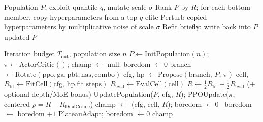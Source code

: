 \begin{algorithm}[t]
\caption{PBT exploit--mutate}
\label{alg:pbt}
\begin{algorithmic}[1]
\Require Population $P$, exploit quantile $q$, mutate scale $\sigma$
\State Rank $P$ by $R$; for each bottom member, copy hyperparameters from a top-$q$ elite
\State Perturb copied hyperparameters by multiplicative noise of scale $\sigma$
\State Refit briefly; write back into $P$
\State \Return updated $P$
\end{algorithmic}
\end{algorithm}

\begin{algorithm}[t]
\caption{HybridMetaSearch}
\label{alg:hybrid}
\begin{algorithmic}[1]
\Require Iteration budget $T_{\mathrm{out}}$, population size $n$
\State $P \gets \mathrm{InitPopulation}(n)$; $\pi \gets \mathrm{ActorCritic}()$; champ $\gets$ null; boredom $\gets 0$
  \State branch $\gets \mathrm{Rotate}(\mathrm{ppo},\mathrm{ga},\mathrm{pbt},\mathrm{nas},\mathrm{combo})$
  \State cfg, hp $\gets \mathrm{Propose}(\mathrm{branch},\,P,\,\pi)$
  \State cell, $R_{\mathrm{fit}} \gets \mathrm{FitCell}(\mathrm{cfg},\,\mathrm{hp.fit\_steps})$
  \State $R_{\mathrm{eval}} \gets \mathrm{EvalCell}(\mathrm{cell})$
  \State $R \gets \tfrac12 R_{\mathrm{fit}} + \tfrac12 R_{\mathrm{eval}}$ (+ optional depth/MoE bonus)
  \State UpdatePopulation($P$, cfg, $R$); PPOUpdate($\pi$, centered $\rho = R - R_{\mathrm{DualCosine}}$)
   champ $\gets$ (cfg, cell, $R$); boredom $\gets 0$
  \Else\ boredom $\gets$ boredom $+1$
  \EndIf
   PlateauAdapt; boredom $\gets 0$
  \EndIf
\EndFor
\State \Return champ
\end{algorithmic}
\end{algorithm}

